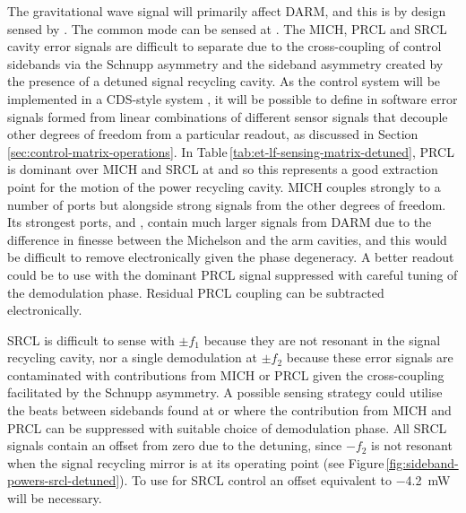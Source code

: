 The gravitational wave signal will primarily affect \gls{DARM}, and this is by design sensed by \ASDC{}. The common mode can be sensed at \REFLFIRST{}. The \gls{MICH}, \gls{PRCL} and \gls{SRCL} cavity error signals are difficult to separate due to the cross-coupling of control sidebands via the Schnupp asymmetry and the sideband asymmetry created by the presence of a detuned signal recycling cavity. As the control system will be implemented in a \LIGO{} \gls{CDS}-style system \cite{Bork2010}, it will be possible to define in software error signals formed from linear combinations of different sensor signals that decouple other degrees of freedom from a particular readout, as discussed in Section\,\ref{sec:control-matrix-operations}. In Table\,\ref{tab:et-lf-sensing-matrix-detuned}, \gls{PRCL} is dominant over \gls{MICH} and \gls{SRCL} at \POPFIRST{} and so this represents a good extraction point for the motion of the power recycling cavity. \gls{MICH} couples strongly to a number of ports but alongside strong signals from the other degrees of freedom. Its strongest ports, \ASDC{} and \ASSECOND{}, contain much larger signals from \gls{DARM} due to the difference in finesse between the Michelson and the arm cavities, and this would be difficult to remove electronically given the phase degeneracy. A better readout could be to use \POPSECOND{} with the dominant \gls{PRCL} signal suppressed with careful tuning of the demodulation phase. Residual \gls{PRCL} coupling can be subtracted electronically.

\gls{SRCL} is difficult to sense with $\pm f_1$ because they are not resonant in the signal recycling cavity, nor a single demodulation at $\pm f_2$ because these error signals are contaminated with contributions from \gls{MICH} or \gls{PRCL} given the cross-coupling facilitated by the Schnupp asymmetry. A possible sensing strategy could utilise the beats between sidebands found at \REFLDIFF{} or \REFLSUM{} where the contribution from \gls{MICH} and \gls{PRCL} can be suppressed with suitable choice of demodulation phase. All \gls{SRCL} signals contain an offset from zero due to the detuning, since $-f_2$ is not resonant when the signal recycling mirror is at its operating point (see Figure\,\ref{fig:sideband-powers-srcl-detuned}). To use \REFLSUM{} for \gls{SRCL} control an offset equivalent to \SI{-4.2}{\milli\watt} will be necessary.

